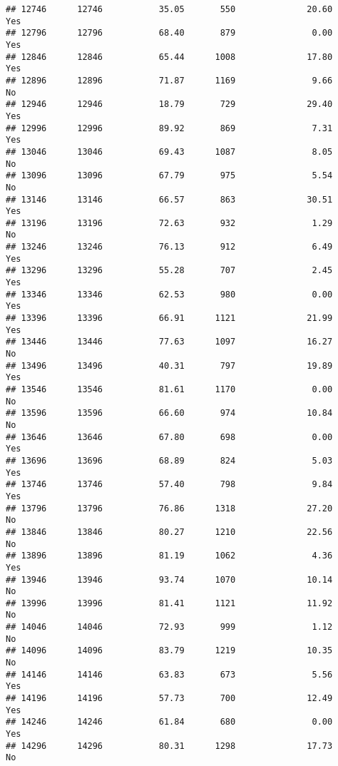 \documentclass[
]{article}
\begin{document}
\begin{verbatim}
## 12746      12746           35.05       550              20.60               Yes
## 12796      12796           68.40       879               0.00               Yes
## 12846      12846           65.44      1008              17.80               Yes
## 12896      12896           71.87      1169               9.66                No
## 12946      12946           18.79       729              29.40               Yes
## 12996      12996           89.92       869               7.31               Yes
## 13046      13046           69.43      1087               8.05                No
## 13096      13096           67.79       975               5.54                No
## 13146      13146           66.57       863              30.51               Yes
## 13196      13196           72.63       932               1.29                No
## 13246      13246           76.13       912               6.49               Yes
## 13296      13296           55.28       707               2.45               Yes
## 13346      13346           62.53       980               0.00               Yes
## 13396      13396           66.91      1121              21.99               Yes
## 13446      13446           77.63      1097              16.27                No
## 13496      13496           40.31       797              19.89               Yes
## 13546      13546           81.61      1170               0.00                No
## 13596      13596           66.60       974              10.84                No
## 13646      13646           67.80       698               0.00               Yes
## 13696      13696           68.89       824               5.03               Yes
## 13746      13746           57.40       798               9.84               Yes
## 13796      13796           76.86      1318              27.20                No
## 13846      13846           80.27      1210              22.56                No
## 13896      13896           81.19      1062               4.36               Yes
## 13946      13946           93.74      1070              10.14                No
## 13996      13996           81.41      1121              11.92                No
## 14046      14046           72.93       999               1.12                No
## 14096      14096           83.79      1219              10.35                No
## 14146      14146           63.83       673               5.56               Yes
## 14196      14196           57.73       700              12.49               Yes
## 14246      14246           61.84       680               0.00               Yes
## 14296      14296           80.31      1298              17.73                No

\end{verbatim}
\end{document}
